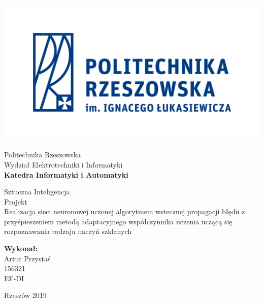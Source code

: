 \documentclass[a4paper, openright, twoside,11pt]{article}
\begin{document}
\begin{titlepage}
            \begin{minipage}{0.3\linewidth}
                    \includegraphics[width=1\columnwidth]{Grafika/prz_pl.png}
            \end{minipage}
            \begin{minipage}{0.7\linewidth}
                \begin{center}
                    \large{Politechnika Rzeszowska\\
                    Wydział Elektrotechniki i Informatyki\\}
                    \Large\textbf{Katedra Informatyki i Automatyki}\\
                \end{center}
            \end{minipage}

            \begin{center}

                \vfill
                    \Huge Sztuczna Inteligencja\\[2cm]
                    \huge Projekt\\[2cm]
                    \huge Realizacja sieci neuronowej uczonej algorytmem wstecznej propagacji błędu z przyśpieszeniem metodą adaptacyjnego współczynnika uczenia uczącą się rozpoznawania rodzaju naczyń szklanych\\
                \vfill
            \end{center}



            
            
            \mbox{}
            \vfill
            \begin{flushright}
               \large{\textbf{Wykonał: \\}
               Artur Przystaś\\
               156321\\
                 EF-DI\\[1cm]}
            \end{flushright}
            \begin{center}
                \large Rzeszów 2019
            \end{center}
        \end{titlepage}
        
\end{document}
